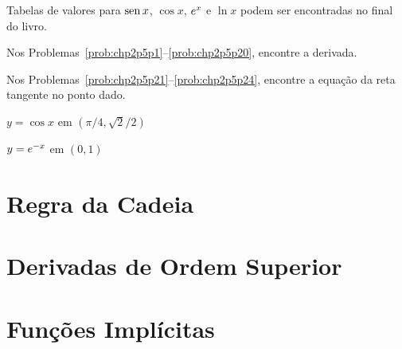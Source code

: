 Tabelas de valores para $\operatorname{sen} x$, $\cos x$, $e^x$ e $\ln x$ podem ser
encontradas no final do livro.

\begin{sectionproblems}
Nos Problemas~\ref{prob:chp2p5p1}--\ref{prob:chp2p5p20}, encontre a derivada.











Nos Problemas~\ref{prob:chp2p5p21}--\ref{prob:chp2p5p24}, encontre a
equação da reta tangente no ponto dado.

%
        {$y = \cos x$ \; em \; $(\pi/4, \sqrt{2}/2)$}

%
        {$y = e^{-x}$ \; em \; $(0, 1)$\label{prob:chp2p5p24}}

\end{sectionproblems}

\section{Regra da Cadeia}
\label{sec:chainrule}

\section{Derivadas de Ordem Superior}
\label{sec:higherderivs}

\section{Funções Implícitas}
\label{sec:implicitfunc}

\begin{chapterproblems}
\end{chapterproblems}



